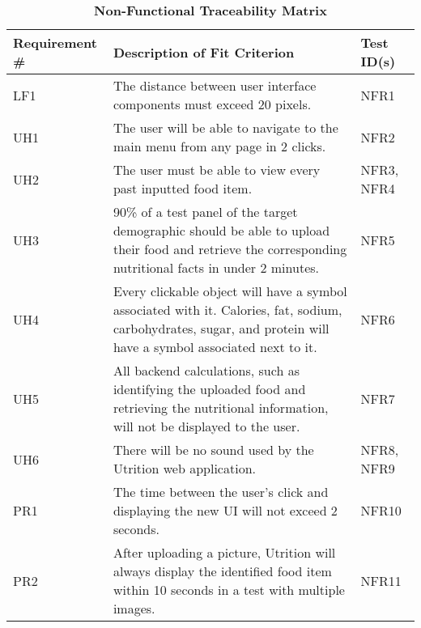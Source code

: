 \documentclass[12pt, titlepage]{article}
\begin{document}
	\begin{table}[H]
		\caption{\bf Non-Functional Traceability Matrix}
		\begin{tabularx}{\textwidth}{|l|X|l|}
			\hline
			{\bf Requirement \#} & {\bf Description of Fit Criterion} & {\bf Test ID(s)}\\
			\hline
			LF1 & The distance between user interface components must exceed 20 pixels. & NFR1 \\
			\hline
			UH1 & The user will be able to navigate to the main menu from any page in 2 clicks. & NFR2 \\
			\hline
			UH2 & The user must be able to view every past inputted food item. & NFR3, NFR4 \\
			\hline
			UH3 & 90\% of a test panel of the target demographic should be able to upload their food and retrieve the corresponding nutritional facts in under 2 minutes. & NFR5 \\
			\hline
			UH4 & Every clickable object will have a symbol associated with it. Calories, fat, sodium, carbohydrates, sugar, and protein will have a symbol associated next to it.
			& NFR6 \\
			\hline
			UH5 & All backend calculations, such as identifying the uploaded food and retrieving the nutritional information, will not be displayed to the user. & NFR7 \\
			\hline
			UH6 & There will be no sound used by the Utrition web application.  & NFR8, NFR9 \\
			\hline
			PR1 & The time between the user’s click and displaying the new UI will not exceed 2 seconds. & NFR10 \\
			\hline
			PR2 & After uploading a picture, Utrition will always display the identified food item within 10 seconds in a test with multiple images. & NFR11 \\
			\hline
		\end{tabularx}
		\label{tab:Non-Functional Traceability}
	\end{table}
\end{document}
